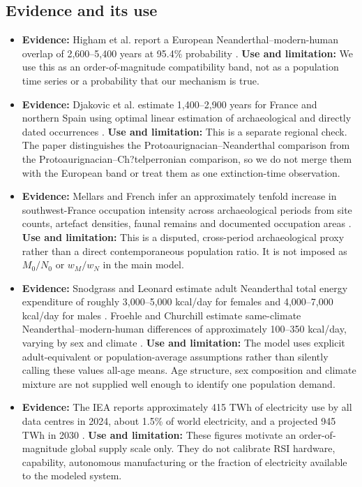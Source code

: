 \documentclass[12pt,a4paper]{article}
\theoremstyle{remark}
\begin{document}
\subsection{Evidence and its use}
\begin{itemize}
\item \textbf{Evidence:} Higham et al. report a European Neanderthal--modern-human overlap of 2,600--5,400 years at 95.4\% probability \cite{higham}.
\textbf{Use and limitation:} We use this as an order-of-magnitude compatibility band, not as a population time series or a probability that our mechanism is true.

\item \textbf{Evidence:} Djakovic et al. estimate 1,400--2,900 years for France and northern Spain using optimal linear estimation of archaeological and directly dated occurrences \cite{djakovic}.
\textbf{Use and limitation:} This is a separate regional check. The paper distinguishes the Protoaurignacian--Neanderthal comparison from the Protoaurignacian--Ch?telperronian comparison, so we do not merge them with the European band or treat them as one extinction-time observation.

\item \textbf{Evidence:} Mellars and French infer an approximately tenfold increase in southwest-France occupation intensity across archaeological periods from site counts, artefact densities, faunal remains and documented occupation areas \cite{mellars}.
\textbf{Use and limitation:} This is a disputed, cross-period archaeological proxy rather than a direct contemporaneous population ratio. It is not imposed as $M_0/N_0$ or $w_M/w_N$ in the main model.

\item \textbf{Evidence:} Snodgrass and Leonard estimate adult Neanderthal total energy expenditure of roughly 3,000--5,000 kcal/day for females and 4,000--7,000 kcal/day for males \cite{snodgrass}. Froehle and Churchill estimate same-climate Neanderthal--modern-human differences of approximately 100--350 kcal/day, varying by sex and climate \cite{froehle}.
\textbf{Use and limitation:} The model uses explicit adult-equivalent or population-average assumptions rather than silently calling these values all-age means. Age structure, sex composition and climate mixture are not supplied well enough to identify one population demand.

\item \textbf{Evidence:} The IEA reports approximately 415 TWh of electricity use by all data centres in 2024, about 1.5\% of world electricity, and a projected 945 TWh in 2030 \cite{iea}.
\textbf{Use and limitation:} These figures motivate an order-of-magnitude global supply scale only. They do not calibrate RSI hardware, capability, autonomous manufacturing or the fraction of electricity available to the modeled system.
\end{itemize}
\end{document}
